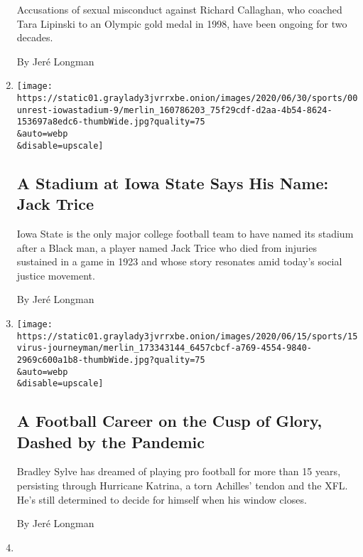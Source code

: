 \begin{enumerate}
  Accusations of sexual misconduct against Richard Callaghan, who
  coached Tara Lipinski to an Olympic gold medal in 1998, have been
  ongoing for two decades.

  By Jeré Longman
\item
  \href{/2020/07/20/sports/ncaafootball/Iowa-State-Jack-Trice-Stadium.html}{}

  \texttt{[image: https://static01.graylady3jvrrxbe.onion/images/2020/06/30/sports/00unrest-iowastadium-9/merlin\_160786203\_75f29cdf-d2aa-4b54-8624-153697a8edc6-thumbWide.jpg?quality=75\\\&auto=webp\\\&disable=upscale]}

  \hypertarget{a-stadium-at-iowa-state-says-his-name-jack-trice}{%
  \subsection{A Stadium at Iowa State Says His Name: Jack
  Trice}\label{a-stadium-at-iowa-state-says-his-name-jack-trice}}

  Iowa State is the only major college football team to have named its
  stadium after a Black man, a player named Jack Trice who died from
  injuries sustained in a game in 1923 and whose story resonates amid
  today's social justice movement.

  By Jeré Longman
\item
  \href{/2020/06/22/sports/football/bradley-sylve-xfl-nfl-journeyman.html}{}

  \texttt{[image: https://static01.graylady3jvrrxbe.onion/images/2020/06/15/sports/15virus-journeyman/merlin\_173343144\_6457cbcf-a769-4554-9840-2969c600a1b8-thumbWide.jpg?quality=75\\\&auto=webp\\\&disable=upscale]}

  \hypertarget{a-football-career-on-the-cusp-of-glory-dashed-by-the-pandemic}{%
  \subsection{A Football Career on the Cusp of Glory, Dashed by the
  Pandemic}\label{a-football-career-on-the-cusp-of-glory-dashed-by-the-pandemic}}

  Bradley Sylve has dreamed of playing pro football for more than 15
  years, persisting through Hurricane Katrina, a torn Achilles' tendon
  and the XFL. He's still determined to decide for himself when his
  window closes.

  By Jeré Longman
\item
  \href{/2020/05/20/sports/coronavirus-sports-fans.html}{}


\end{enumerate}
